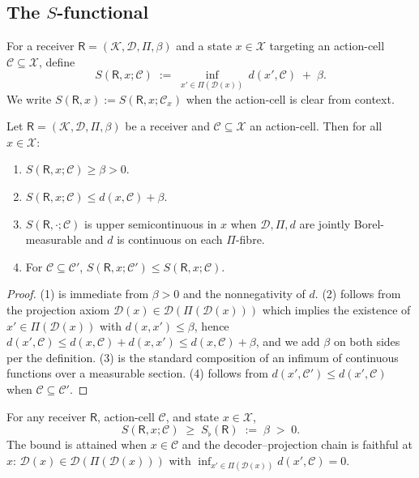 \documentclass[twocolumn,11pt,a4paper]{article}
\newcommand{\K}{\mathcal{K}}
\newcommand{\D}{\mathcal{D}}
\newcommand{\X}{\mathcal{X}}
\newcommand{\Cell}{\mathcal{C}}
\newcommand{\receiver}{\mathsf{R}}
\newcommand{\Sfloor}{S_{\flat}}
\begin{document}
\subsection{The $S$-functional}

\begin{definition}[$S$-functional]\label{def:S}
For a receiver $\receiver=(\K,\D,\Pi,\beta)$ and a state $x\in\X$ targeting
an action-cell $\Cell\subseteq\X$, define
\[
S(\receiver,x;\Cell)\;:=\;\inf_{x'\in\Pi(\D(x))}\,d(x',\Cell)\;+\;\beta.
\]
We write $S(\receiver,x):=S(\receiver,x;\Cell_x)$ when the action-cell is
clear from context.
\end{definition}

\begin{proposition}\label{prop:basic-S}
Let $\receiver=(\K,\D,\Pi,\beta)$ be a receiver and $\Cell\subseteq\X$ an
action-cell. Then for all $x\in\X$:
\begin{enumerate}[label=(\arabic*),leftmargin=*]
\item $S(\receiver,x;\Cell)\ge\beta>0$.
\item $S(\receiver,x;\Cell)\le d(x,\Cell)+\beta$.
\item $S(\receiver,\cdot;\Cell)$ is upper semicontinuous in $x$ when
$\D,\Pi,d$ are jointly Borel-measurable and $d$ is continuous on each
$\Pi$-fibre.
\item For $\Cell\subseteq\Cell'$, $S(\receiver,x;\Cell')\le
S(\receiver,x;\Cell)$.
\end{enumerate}
\end{proposition}

\begin{proof}
(1) is immediate from $\beta>0$ and the nonnegativity of $d$. (2) follows
from the projection axiom $\D(x)\in\D(\Pi(\D(x)))$ which implies the
existence of $x'\in\Pi(\D(x))$ with $d(x,x')\le\beta$, hence
$d(x',\Cell)\le d(x,\Cell)+d(x,x')\le d(x,\Cell)+\beta$, and we add $\beta$
on both sides per the definition. (3) is the standard composition of an
infimum of continuous functions over a measurable section. (4) follows from
$d(x',\Cell')\le d(x',\Cell)$ when $\Cell\subseteq\Cell'$.
\end{proof}

\begin{theorem}\label{thm:floor-receiver}
For any receiver $\receiver$, action-cell $\Cell$, and state $x\in\X$,
\[
S(\receiver,x;\Cell)\;\ge\;\Sfloor(\receiver)\;:=\;\beta\;>\;0.
\]
The bound is attained when $x\in\Cell$ and the decoder--projection chain is
faithful at $x$: $\D(x)\in\D(\Pi(\D(x)))$ with
$\inf_{x'\in\Pi(\D(x))}d(x',\Cell)=0$.
\end{theorem}
\end{document}
